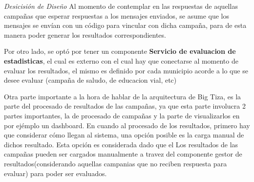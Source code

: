 \documentclass[a4paper, 11pt]{article}
\begin{document}
\emph{Desicisión de Diseño}
Al momento de contemplar en las respuestas de aquellas campañas que esperar respuestas a los mensajes enviados, se asume que los mensajes se envían con un código para vincular con dicha campaña, para de esta manera poder generar los resultados correspondientes.

Por otro lado, se optó por tener un componente \textbf{Servicio de evaluacion de estadisticas}, el cual es externo con el cual hay que conectarse al momento de evaluar los resultados, el mismo es definido por cada municipio acorde a lo que se desee evaluar (campaña de saludo, de educacion vial, etc)

Otra parte importante a la hora de hablar de la arquitectura de Big Tiza, es la parte del procesado de resultados de las campañas, ya que esta parte involucra 2 partes importantes, la de procesado de campañas y la parte de visualizarlos en por ejémplo un dashboard.
En cuando al procesado de los resultados, primero hay que considerar cómo llegan al sistema, una opción posible es la carga manual de dichos resultado. Esta opción es considerada dado que el 
Los resultados de las campañas pueden ser cargados manualmente a travez del componente gestor de resultados(considerando aquellas campanias que no reciben respuesta para evaluar) para poder ser evaluados.
\end{document}
